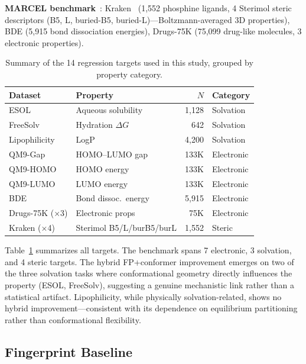 \documentclass[sigconf]{acmart}
\begin{document}
\textbf{MARCEL benchmark}~\cite{axelrod2024marcel}: Kraken~\cite{gensch2022kraken} (1,552 phosphine ligands, 4 Sterimol steric descriptors (B5, L, buried-B5, buried-L)---Boltzmann-averaged 3D properties), BDE (5,915 bond dissociation energies), Drugs-75K (75,099 drug-like molecules, 3 electronic properties).

\begin{table}[t]
\caption{Summary of the 14 regression targets used in this study, grouped by property category.}
\label{tab:datasets}
\centering
\scriptsize
\begin{tabular}{@{}llrl@{}}
\toprule
Dataset & Property & $N$ & Category \\
\midrule
ESOL          & Aqueous solubility  & 1,128   & Solvation \\
FreeSolv      & Hydration $\Delta G$ & 642    & Solvation \\
Lipophilicity & LogP                & 4,200   & Solvation \\
\midrule
QM9-Gap       & HOMO--LUMO gap      & 133K    & Electronic \\
QM9-HOMO      & HOMO energy         & 133K    & Electronic \\
QM9-LUMO      & LUMO energy         & 133K    & Electronic \\
BDE           & Bond dissoc.\ energy & 5,915  & Electronic \\
Drugs-75K ($\times$3) & Electronic props & 75K & Electronic \\
\midrule
Kraken ($\times$4) & Sterimol B5/L/burB5/burL & 1,552 & Steric \\
\bottomrule
\end{tabular}
\end{table}

Table~\ref{tab:datasets} summarizes all targets. The benchmark spans 7 electronic, 3 solvation, and 4 steric targets. The hybrid FP+conformer improvement emerges on two of the three solvation tasks where conformational geometry directly influences the property (ESOL, FreeSolv), suggesting a genuine mechanistic link rather than a statistical artifact. Lipophilicity, while physically solvation-related, shows no hybrid improvement---consistent with its dependence on equilibrium partitioning rather than conformational flexibility.

\subsection{Fingerprint Baseline}
\end{document}
